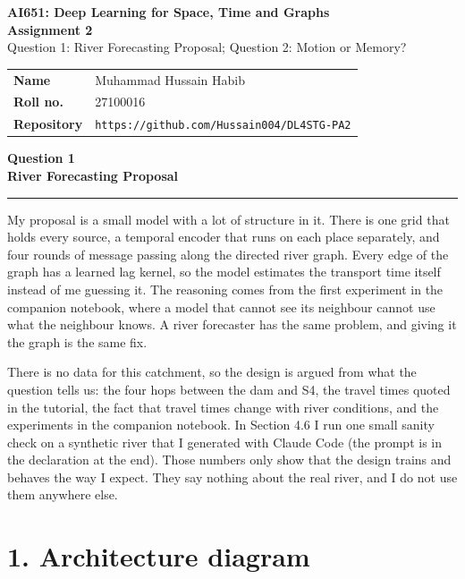\documentclass[11pt,letterpaper]{article}
\newcommand{\taskbanner}[2]{\begin{center}{\small\bfseries #1}\\[3pt]{\Large\bfseries #2}\end{center}\vspace{2pt}\hrule\vspace{8pt}}
\begin{document}
\begin{center}
  {\small\bfseries AI651: Deep Learning for Space, Time and Graphs}\\[6pt]
  {\Large\bfseries Assignment 2}\\[6pt]
  {\small Question 1: River Forecasting Proposal; Question 2: Motion or Memory?}
\end{center}

\vspace{2pt}
\noindent\begin{tabular}{@{}p{0.8in}p{5.6in}@{}}
\textbf{Name}      & Muhammad Hussain Habib \\
\textbf{Roll no.}  & 27100016 \\
\textbf{Repository} & \texttt{https://github.com/Hussain004/DL4STG-PA2} \\
\end{tabular}

\vspace{6pt}
\normalsize

\taskbanner{Question 1}{River Forecasting Proposal}

My proposal is a small model with a lot of structure in it. There is one grid
that holds every source, a temporal encoder that runs on each place separately,
and four rounds of message passing along the directed river graph. Every edge of
the graph has a learned lag kernel, so the model estimates the transport time
itself instead of me guessing it. The reasoning comes from the first experiment
in the companion notebook, where a model that cannot see its neighbour cannot
use what the neighbour knows. A river forecaster has the same problem, and giving
it the graph is the same fix.

There is no data for this catchment, so the
design is argued from what the question tells us: the four hops between the dam
and S4, the travel times quoted in the tutorial, the fact that travel times
change with river conditions, and the experiments in the companion notebook. In
Section 4.6 I run one small sanity check on a synthetic river that I generated
with Claude Code (the prompt is in the declaration at the end). Those numbers
only show that the design trains and behaves the way I expect. They say nothing
about the real river, and I do not use them anywhere else.

\section*{1. Architecture diagram}
\end{document}
